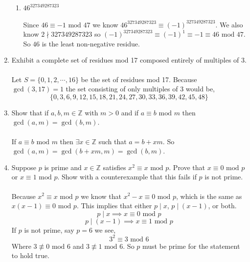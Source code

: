\documentclass[class=article, crop=false]{standalone}
\def\integers{{\mathbb Z}}
\begin{document}
\begin{enumerate}
\begin{enumerate}
  \item $46^{327349287323}$ \\\\
  Since $46\equiv -1\mbox{ mod } 47$ we know $46^{327349287323} \equiv (-1)^{327349287323}$.
  We also know $2\nmid 327349287323$ so $(-1)^{327349287323} \equiv (-1)^1 \equiv -1 \equiv 46\mbox{ mod } 47$.
  So $46$ is the least non-negative residue.

  \end{enumerate}

\item
  Exhibit a complete set of residues mod 17 composed entirely of
  multiples of 3. \\\\
  Let $S= \{0,1,2,\cdots,16\}$ be the set of residues mod 17. Because $\gcd(3,17)=1$ 
  the set consisting of only multiples of 3 would be,
  $$\{0,3,6,9,12,15,18,21,24,27,30,33,36,39,42,45,48\}$$

\item
  Show that if $a,b,m\in\integers$ with $m>0$ and if
  $a\equiv b\mbox{ mod } m$ then $\gcd(a,m)=\gcd(b,m)$. \\\\
  If $a\equiv b\mbox{ mod } m$ then $\exists x\in\integers$ such that $a=b+xm$.
  So $\gcd(a,m)=\gcd(b+xm,m)=\gcd(b,m)$.

\item
  Suppose $p$ is prime and $x\in\integers$ satisfies
  $x^2\equiv x\mbox{ mod } p$.  Prove that $x\equiv 0\mbox{ mod } p$ or $x\equiv 1\mbox{ mod } p$.
  Show with a counterexample that this fails if $p$ is not prime. \\\\
  Because $x^2\equiv x\mbox{ mod } p$ we know that $x^2-x\equiv 0\mbox{ mod } p$,
  which is the same as $x(x-1) \equiv 0\mbox{ mod } p$. This implies that
  either $p\mid x$, $p\mid (x-1)$, or both.
  $$p\mid x \implies x\equiv 0\mbox{ mod } p$$
  $$p\mid (x-1) \implies x\equiv 1\mbox{ mod } p$$
  If $p$ is not prime, say $p=6$ we see,
  $$3^2 \equiv 3 \mbox{ mod } 6$$
  Where $3\not\equiv 0\mbox{ mod }6$ and $3\not\equiv 1\mbox{ mod }6$. So $p$ must be prime for the
  statement to hold true.


\end{enumerate}
\end{document}
